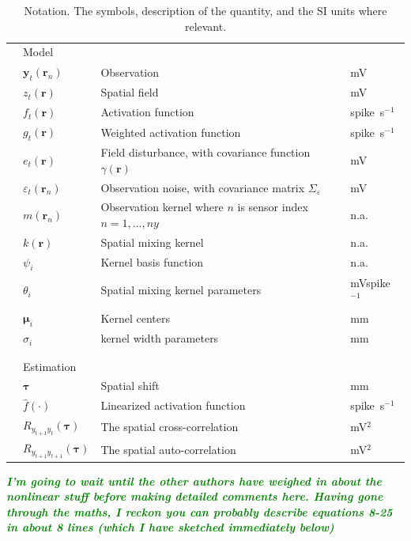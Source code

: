\documentclass[10pt,twocolumn,twoside]{IEEEtran}
\newcommand{\mike}[1]{\textsf{\emph{\textbf{\textcolor{green}{#1}}}}}
\begin{document}
\begin {table}[t]
\begin{center}
{\begin{tabular}{llll}
	& Model&& \\
	& $\mathbf{y}_t(\mathbf{r}_n)$ & Observation & mV \\
	& $z_t(\mathbf{r})$ & Spatial field & mV \\ 
	& $f_t(\mathbf{r})$ & Activation function & spike~s$^{-1}$ \\ 
	& $g_t(\mathbf{r})$ & Weighted activation function & spike~s$^{-1}$ \\
 	& $e_t(\mathbf{r})$ & Field disturbance, with covariance function $\gamma(\mathbf{r})$  & mV \\
 	& $\varepsilon_t(\mathbf{r}_n)$ & Observation noise, with covariance matrix $\Sigma_{\varepsilon}$  & mV \\  
 	& $m(\mathbf{r}_n)$ &Observation kernel where $n$ is sensor index $n=1,..., ny$& n.a.
\\  
 	& $k(\mathbf{r})$ & Spatial mixing kernel& n.a.
\\ 
	&$\psi_i$&Kernel basis function&n.a.\\
	&$\theta_i$ &Spatial mixing kernel parameters&mVspike$^{-1}$ \\ 
	& $\boldsymbol\mu_i$ &Kernel centers& mm \\  
	& $\sigma_{i}$ &kernel width parameters&mm \\ 
\\  
\\  
	& Estimation&& \\
 	& $\boldsymbol\tau$ &Spatial shift& mm \\
  & $\hat{f}(\cdot)$ &Linearized activation function& spike~s$^{-1}$ \\  
  & $R_{y_{t+1}y_t}(\boldsymbol{\tau}) $ &The spatial cross-correlation & mV$^{2}$ \\  
  & $R_{y_{t+1}y_{t+1}}(\boldsymbol{\tau})$ & The spatial auto-correlation& mV$^{2}$ \\    
 	\hline \hline
	\end{tabular}}
 \caption {Notation.
The symbols, description of the quantity, and the SI units where relevant.} 
 \label{table:Notation}
 \end{center}
 \end {table}

\mike{I'm going to wait until the other authors have weighed in about the nonlinear stuff before making detailed comments here. Having gone through the maths, I reckon you can probably describe equations 8-25 in about 8 lines (which I have sketched immediately below)}
\end{document}
